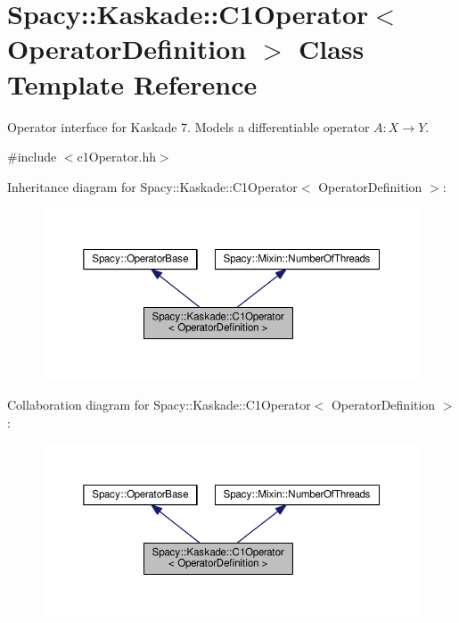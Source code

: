 \hypertarget{classSpacy_1_1Kaskade_1_1C1Operator}{}\section{Spacy\+:\+:Kaskade\+:\+:C1\+Operator$<$ Operator\+Definition $>$ Class Template Reference}
\label{classSpacy_1_1Kaskade_1_1C1Operator}


Operator interface for Kaskade 7. Models a differentiable operator $A:X\rightarrow Y$.  




{\ttfamily \#include $<$c1\+Operator.\+hh$>$}



Inheritance diagram for Spacy\+:\+:Kaskade\+:\+:C1\+Operator$<$ Operator\+Definition $>$\+:\nopagebreak
\begin{figure}[H]
\begin{center}
\leavevmode
\includegraphics[width=350pt]{classSpacy_1_1Kaskade_1_1C1Operator__inherit__graph}
\end{center}
\end{figure}


Collaboration diagram for Spacy\+:\+:Kaskade\+:\+:C1\+Operator$<$ Operator\+Definition $>$\+:\nopagebreak
\begin{figure}[H]
\begin{center}
\leavevmode
\includegraphics[width=350pt]{classSpacy_1_1Kaskade_1_1C1Operator__coll__graph}
\end{center}
\end{figure}
